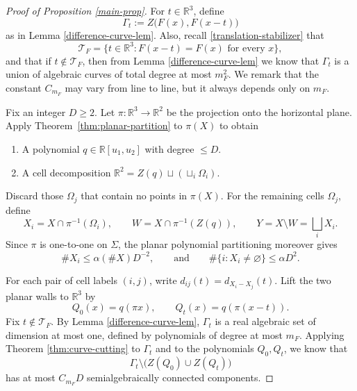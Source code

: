 \documentclass{amsart}%
\numberwithin{equation}{section}
\newcommand{\ZR}{\mathbb{R}}
\newcommand{\R}{\mathbb{R}}
\newcommand{\1}{\mathbbm{1}}
\begin{document}
\begin{proof}[Proof of Proposition \ref{main-prop}]

For $t\in\R^3$, define
\[
    \Gamma_t:= Z\bigl(F(x),F(x-t)\bigr)
\]
as in Lemma \ref{difference-curve-lem}. 
Also, recall \eqref{translation-stabilizer} that
\[
    \mathcal{T}_F = \{t\in\R^3 : F(x-t)=F(x) \text{ for every }x\},
\]
and that if $t\notin\mathcal T_F$, then from Lemma \ref{difference-curve-lem} we know that $\Gamma_t$ is a union of algebraic curves of total degree at most $m_F^2$. 
We remark that the constant $C_{m_F}$ may vary from line to line, but it always depends only on $m_F$.

\medskip




Fix an integer $D\geq2$. 
Let $\pi:\ZR^3\to\ZR^2$ be the projection onto the horizontal plane.
Apply Theorem~\ref{thm:planar-partition} to $\pi(X)$ to obtain
\begin{enumerate}
    \item A polynomial $q\in\R[u_1,u_2]$ with degree $\leq D$.
    \item A cell decomposition $\ZR^2=Z(q)\sqcup(\sqcup_i \Omega_i)$.
\end{enumerate}
Discard those $\Omega_j$ that contain no points in $\pi(X)$.
For the remaining cells $\Omega_j$, define 
\begin{equation}
\nonumber
    X_i=X\cap\pi^{-1}(\Omega_i),
    \qquad
    W=X\cap\pi^{-1} (Z(q)),
    \qquad
    Y=X\setminus W=\bigsqcup_iX_i.
\end{equation}
Since $\pi$ is one-to-one on $\Sigma$, the planar polynomial partitioning moreover gives
\begin{equation}
\label{eq:cell-size-count}
    \#X_i\leq\alpha (\#X)D^{-2},
    \qquad\text{and}\qquad
    \#\{i:X_i\neq\varnothing\}\leq\alpha D^2.
\end{equation}


\medskip



For each pair of cell labels $(i,j)$, write $d_{ij}(t)=d_{X_i-X_j}(t)$. 
Lift the two planar walls to $\R^3$ by
\[
 Q_0(x)=q(\pi x),
 \qquad
 Q_t(x)=q(\pi(x-t)).
\]
Fix $t\notin\mathcal T_F$.  
By Lemma \ref{difference-curve-lem}, $\Gamma_t$ is a real algebraic set of dimension at most one, defined by polynomials of degree at most $m_F$.
Applying Theorem \ref{thm:curve-cutting} to $\Gamma_t$ and to the polynomials $Q_0,Q_t$, we know that
\begin{equation}
\label{eq:cut-spatial-difference-curve}
    \Gamma_t\setminus\bigl( Z(Q_0)\cup Z(Q_t)\bigr)
\end{equation}
has at most $C_{m_F}D$ semialgebraically connected components.


\end{proof}
\end{document}
